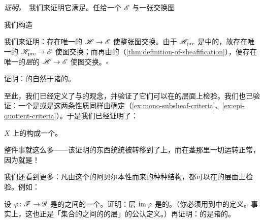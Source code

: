 \emph{证明。}\ 我们来证明它满足\trUniversalProperty。任给一个\trSheaf{} $\mathscr{E}$ 与一张交换图
我们构造
我们来证明：存在唯一的\trMorphism{} $\mathscr{H}\to\mathscr{E}$ 使整张图交换。由于 $\mathscr{H}_{\mathrm{pre}}$ 是\trPresheaf\trCategory{}中的\trCokernel，故存在唯一的\trPresheaf\trMorphism{} $\mathscr{H}_{\mathrm{pre}}\to\mathscr{E}$ 使图交换；而再由\trSheafification{}的\trUniversalProperty（\cref{thm:definition-of-sheafification}），便存在唯一的\emph{层}的\trMorphism{} $\mathscr{H}\to\mathscr{E}$ 使图交换。\hfill$\square$

\begin{exercise}\label{ex:stalk-of-cokernel}
证明：\trCokernel{}的\trStalk{}自然\trIsomorphic{}于诸\trStalk{}的\trCokernel。
\end{exercise}

至此，我们已经定义了\trKernel{}与\trCokernel{}的观念，并验证了它们可以在\trStalk{}的层面上检验。我们也已验证：一个\trMorphism{}是\trMonomorphism{}或是\trEpimorphism{}这两条性质同样由\trStalk{}确定（\cref{ex:mono-subsheaf-criteria}、\cref{ex:epi-quotient-criteria}）。于是我们已经证明了：

\begin{theorem}\label{thm:sheaves-abelian-category}
\trTopologicalSpace{} $X$ 上\trAbelianGroups{}的\trSheaves{}构成一个\trAbelianCategory。
\end{theorem}

整件事就这么多——该证明的东西统统被转移到了\trStalk{}上，而在茎那里一切运转正常，因为\trStalk{}就是\trAbelianGroups{}！

我们还看到更多：凡由这个\trCategory{}的阿贝尔本性而来的种种结构，都可以在\trStalk{}的层面上检验。例如：

\begin{exercise}\label{ex:image-sheaf-sheafification}
设 $\varphi\colon\mathscr{F}\to\mathscr{G}$ 是\trAbelianGroups{}的\trSheaves{}之间的一个\trMorphism。证明：\trImage{}层 $\operatorname{im}\varphi$ 是\trImage{}\trPresheaf{}的\trSheafification。（你必须用到\trAbelianCategory{}中\trImage{}的定义。事实上，这也正是「集合的\trSheaves{}之间的\trMorphism{}的\trImage{}层」的公认定义。）再证明：\trImage{}的\trStalk{}是诸\trStalk{}的\trImage。
\end{exercise}

